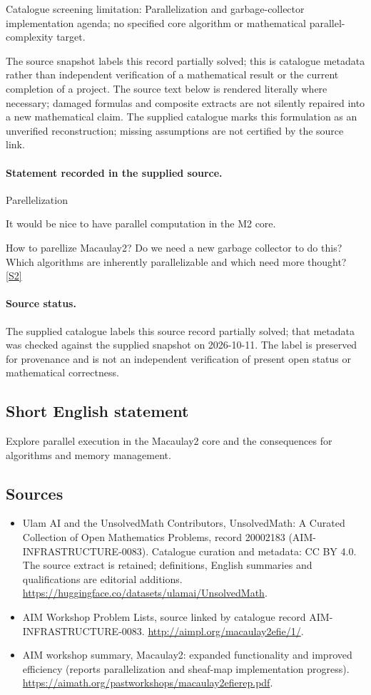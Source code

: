 \documentclass[11pt]{article}
\begin{document}
Catalogue screening limitation: Parallelization and garbage-collector implementation agenda; no specified core algorithm or mathematical parallel-complexity target.

The source snapshot labels this record partially solved; this is catalogue metadata rather than independent verification of a mathematical result or the current completion of a project.
The source text below is rendered literally where necessary; damaged formulas and composite extracts are not silently repaired into a new mathematical claim.
The supplied catalogue marks this formulation as an unverified reconstruction; missing assumptions are not certified by the source link.
\paragraph{Statement recorded in the supplied source.}
Parellelization

It would be nice to have parallel computation in the M2 core.

How to parellize Macaulay2? Do we need a new garbage collector to do this? Which algorithms are inherently parallelizable and which need more thought? \href{http://aimpl.org/macaulay2efie/1/}{[S2]}
\paragraph{Source status.}
The supplied catalogue labels this source record partially solved; that metadata was checked against the supplied snapshot on 2026-10-11. The label is preserved for provenance and is not an independent verification of present open status or mathematical correctness.
\subsection{Short English statement}
Explore parallel execution in the Macaulay2 core and the consequences for algorithms and memory management.
\subsection{Sources}
\begin{itemize}
\item[S1] Ulam AI and the UnsolvedMath Contributors, UnsolvedMath: A Curated Collection of Open Mathematics Problems, record 20002183 (AIM-INFRASTRUCTURE-0083). Catalogue curation and metadata: CC BY 4.0. The source extract is retained; definitions, English summaries and qualifications are editorial additions.
\url{https://huggingface.co/datasets/ulamai/UnsolvedMath}.
\item[S2] AIM Workshop Problem Lists, source linked by catalogue record AIM-INFRASTRUCTURE-0083.
\url{http://aimpl.org/macaulay2efie/1/}.
\item[S3] AIM workshop summary, Macaulay2: expanded functionality and improved efficiency (reports parallelization and sheaf-map implementation progress).
\url{https://aimath.org/pastworkshops/macaulay2efierep.pdf}.
\end{itemize}
\end{document}
